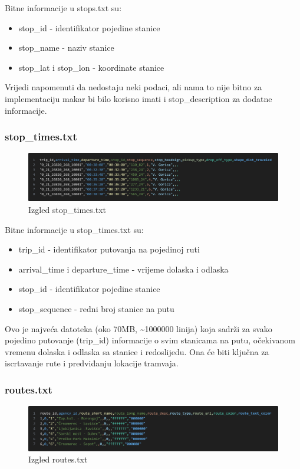 \documentclass[zavrsnirad]{fer}
\begin{document}
Bitne informacije u stops.txt su:
\begin{itemize}
	\item stop\_id - identifikator pojedine stanice
	\item stop\_name - naziv stanice
	\item stop\_lat i stop\_lon - koordinate stanice
\end{itemize}
Vrijedi napomenuti da nedostaju neki podaci, ali nama to nije bitno za implementaciju makar bi bilo korisno imati i stop\_description za dodatne informacije.

\subsubsection{stop\_times.txt}

\begin{figure}[htb]
	\centering
	\includegraphics[width=0.7\linewidth]{Figures/stop_times.png} 
	\caption{Izgled stop\_times.txt}
	\label{slk:stop_times}
\end{figure}

Bitne informacije u stop\_times.txt su:
\begin{itemize}
	\item trip\_id - identifikator putovanja na pojedinoj ruti
	\item arrival\_time i departure\_time - vrijeme dolaska i odlaska
	\item stop\_id - identifikator pojedine stanice
	\item stop\_sequence - redni broj stanice na putu
\end{itemize}
Ovo je najveća datoteka (oko 70MB, \textasciitilde{}1000000 linija) koja sadrži za svako pojedino putovanje (trip\_id) informacije o svim stanicama na putu, očekivanom vremenu dolaska i odlaska sa stanice i redoslijedu. Ona će biti ključna za iscrtavanje rute i predviđanju lokacije tramvaja.

\subsubsection{routes.txt}

\begin{figure}[htb]
	\centering
	\includegraphics[width=0.7\linewidth]{Figures/routes.png} 
	\caption{Izgled routes.txt}
	\label{slk:routes}
\end{figure}
\end{document}
